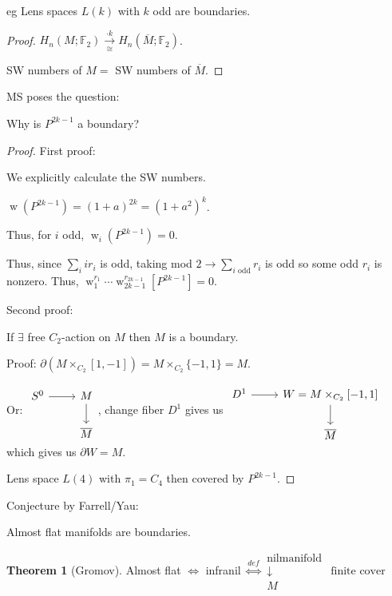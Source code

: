 \documentclass{article}
\theoremstyle{definition}
\newtheorem{theorem}{Theorem}
\begin{document}
    eg Lens spaces \(L(k)\) with \(k\) odd are boundaries.

    \begin{proof}
        \(H_n(M;\mathbb{F}_2) \xrightarrow[\cong]{\cdot k} H_n(\overline{M};\mathbb{F}_2)\).
        
        SW numbers of \(M =\) SW numbers of \(\overline{M}\).
    \end{proof}

    MS poses the question:

    Why is \(P^{2k-1}\) a boundary?

    \begin{proof}
        First proof: 

        We explicitly calculate the SW numbers.

        \(\operatorname{w}(P^{2k-1}) = (1+a)^{2k} = (1+a^2)^k\).
        
        Thus, for \(i\) odd, \(\operatorname{w}_i(P^{2k-1}) = 0\).

        Thus, since \(\sum_{i} ir_i\) is odd, taking mod \(2 \to \sum_{i \text{ odd}} r_i\) is odd so some odd \(r_i\) is nonzero. Thus, \(\operatorname{w}_1^{r_1} \cdots \operatorname{w}_{2k-1}^{r_{2k-1}}[P^{2k-1}] = 0\).
        
        Second proof:

        If \(\exists\) free \(C_2\)-action on \(M\) then \(M\) is a boundary.

        Proof: \(\partial (M \times_{C_2} [1,-1]) = M \times_{C_2} \{ -1, 1 \} = M\).

        Or: \(\begin{tikzcd} S^0\ar[r] & M \ar[d] \\ & \overline{M} \end{tikzcd}\), change fiber \(D^1\) gives us \(\begin{tikzcd} D^1 \ar[r] & W = M \times_{C_2} [-1,1] \ar[d] \\ & \overline{M} \end{tikzcd}\) which gives us \(\partial W = M\). 

        Lens space \(L(4)\) with \(\pi_1 = C_4\) then covered by \(P^{2k-1}\).
    \end{proof}

    Conjecture by Farrell/Yau:

    Almost flat manifolds are boundaries.

    \begin{theorem}
        [Gromov] Almost flat \(\iff\) infranil \(\overset{def}{\iff } \begin{matrix} \text{nilmanifold} \\ \downarrow & \text{finite cover} \\ M \end{matrix}\) 
    \end{theorem}
\end{document}
